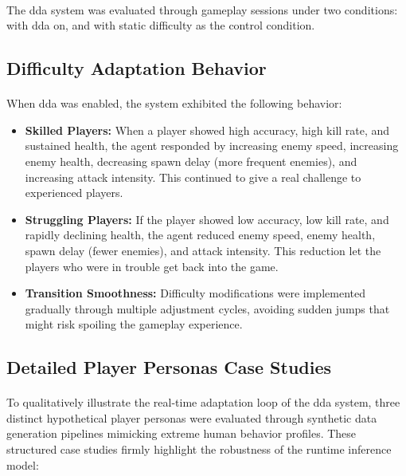 \paragraph{} The \ac{dda} system was evaluated through gameplay sessions under two conditions: with \ac{dda} on, and with static difficulty as the control condition.

\subsection{Difficulty Adaptation Behavior}
\paragraph{} When \ac{dda} was enabled, the system exhibited the following behavior:

\begin{itemize}
	\item \textbf{Skilled Players:} When a player showed high accuracy, high kill rate, and sustained health, the agent responded by increasing enemy speed, increasing enemy health, decreasing spawn delay (more frequent enemies), and increasing attack intensity. This continued to give a real challenge to experienced players.
	\item \textbf{Struggling Players:} If the player showed low accuracy, low kill rate, and rapidly declining health, the agent reduced enemy speed, enemy health, spawn delay (fewer enemies), and attack intensity. This reduction let the players who were in trouble get back into the game.
	\item \textbf{Transition Smoothness:} Difficulty modifications were implemented gradually through multiple adjustment cycles, avoiding sudden jumps that might risk spoiling the gameplay experience.
\end{itemize}

\subsection{Detailed Player Personas Case Studies}
\paragraph{} To qualitatively illustrate the real-time adaptation loop of the \ac{dda} system, three distinct hypothetical player personas were evaluated through synthetic data generation pipelines mimicking extreme human behavior profiles. These structured case studies firmly highlight the robustness of the runtime inference model:
